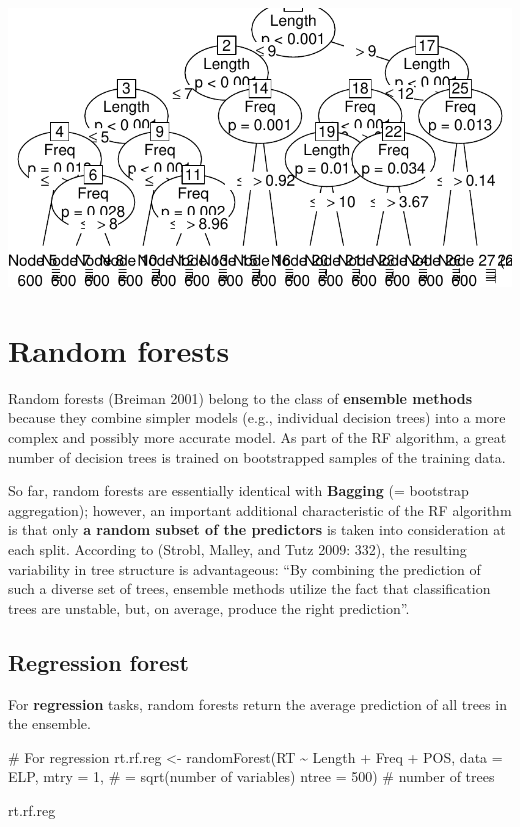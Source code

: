 \documentclass[
  11pt,
  letterpaper,
  DIV=11,
  numbers=noendperiod]{scrreprt}
\newenvironment{Shaded}{\begin{snugshade}}{\end{snugshade}}
\newcommand{\AttributeTok}[1]{\textcolor[rgb]{0.40,0.45,0.13}{#1}}
\newcommand{\CommentTok}[1]{\textcolor[rgb]{0.37,0.37,0.37}{#1}}
\newcommand{\DecValTok}[1]{\textcolor[rgb]{0.68,0.00,0.00}{#1}}
\newcommand{\FunctionTok}[1]{\textcolor[rgb]{0.28,0.35,0.67}{#1}}
\newcommand{\NormalTok}[1]{\textcolor[rgb]{0.00,0.23,0.31}{#1}}
\newcommand{\OtherTok}[1]{\textcolor[rgb]{0.00,0.23,0.31}{#1}}
\newcommand{\SpecialCharTok}[1]{\textcolor[rgb]{0.37,0.37,0.37}{#1}}
\begin{document}
\includegraphics{Decision_trees_and_random_forests_files/figure-pdf/unnamed-chunk-6-2.pdf}

\section{Random forests}\label{random-forests}

Random forests (Breiman 2001) belong to the class of \textbf{ensemble
methods} because they combine simpler models (e.g., individual decision
trees) into a more complex and possibly more accurate model. As part of
the RF algorithm, a great number of decision trees is trained on
bootstrapped samples of the training data.

So far, random forests are essentially identical with \textbf{Bagging}
(= bootstrap aggregation); however, an important additional
characteristic of the RF algorithm is that only \textbf{a random subset
of the predictors} is taken into consideration at each split. According
to (Strobl, Malley, and Tutz 2009: 332), the resulting variability in
tree structure is advantageous: ``By combining the prediction of such a
diverse set of trees, ensemble methods utilize the fact that
classification trees are unstable, but, on average, produce the right
prediction''.

\subsection{Regression forest}\label{regression-forest}

For \textbf{regression} tasks, random forests return the average
prediction of all trees in the ensemble.

\begin{Shaded}
\begin{Highlighting}[]
\CommentTok{\# For regression}
\NormalTok{rt.rf.reg }\OtherTok{\textless{}{-}} \FunctionTok{randomForest}\NormalTok{(RT }\SpecialCharTok{\textasciitilde{}}\NormalTok{ Length }\SpecialCharTok{+}\NormalTok{ Freq }\SpecialCharTok{+}\NormalTok{ POS, }\AttributeTok{data =}\NormalTok{ ELP,}
                                \AttributeTok{mtry =} \DecValTok{1}\NormalTok{, }\CommentTok{\# = sqrt(number of variables)}
                                \AttributeTok{ntree =} \DecValTok{500}\NormalTok{) }\CommentTok{\# number of trees}

\NormalTok{rt.rf.reg}
\end{Highlighting}
\end{Shaded}
\end{document}
